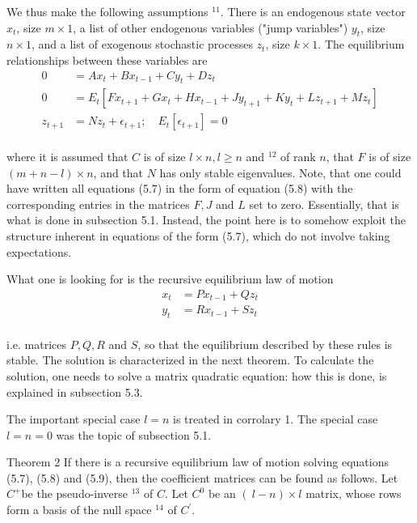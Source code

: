 \documentclass[10pt]{article}
\begin{document}
We thus make the following assumptions ${ }^{11}$. There is an endogenous state vector $x_{t}$, size $m \times 1$, a list of other endogenous variables ("jump variables") $y_{t}$, size $n \times 1$, and a list of exogenous stochastic processes $z_{t}$, size $k \times 1$. The equilibrium relationships between these variables are\\
\begin{align*}
0 & =A x_{t}+B x_{t-1}+C y_{t}+D z_{t}  \tag{5.7}\\
0 & =E_{t}\left[F x_{t+1}+G x_{t}+H x_{t-1}+J y_{t+1}+K y_{t}+L z_{t+1}+M z_{t}\right]  \tag{5.8}\\
z_{t+1} & =N z_{t}+\epsilon_{t+1} ; \quad E_{t}\left[\epsilon_{t+1}\right]=0 \tag{5.9}
\end{align*}\\
where it is assumed that $C$ is of size $l \times n, l \geq n$ and $^{12}$ of rank $n$, that $F$ is of size $(m+n-l) \times n$, and that $N$ has only stable eigenvalues. Note, that one could have written all equations (5.7) in the form of equation (5.8) with the corresponding entries in the matrices $F, J$ and $L$ set to zero. Essentially, that is what is done in subsection 5.1. Instead, the point here is to somehow exploit the structure inherent in equations of the form (5.7), which do not involve taking expectations.

What one is looking for is the recursive equilibrium law of motion\\
\begin{align*}
x_{t} & =P x_{t-1}+Q z_{t}  \tag{5.10}\\
y_{t} & =R x_{t-1}+S z_{t} \tag{5.11}
\end{align*}\\
i.e. matrices $P, Q, R$ and $S$, so that the equilibrium described by these rules is stable. The solution is characterized in the next theorem. To calculate the solution, one needs to solve a matrix quadratic equation: how this is done, is explained in subsection 5.3.

The important special case $l=n$ is treated in corrolary 1. The special case $l=n=0$ was the topic of subsection 5.1.

Theorem 2 If there is a recursive equilibrium law of motion solving equations (5.7), (5.8) and (5.9), then the coefficient matrices can be found as follows. Let $C^{+}$be the pseudo-inverse ${ }^{13}$ of $C$. Let $C^{0}$ be an $(~ l-n) \times l$ matrix, whose rows form a basis of the null space ${ }^{14}$ of $C^{\prime}$.
\end{document}
